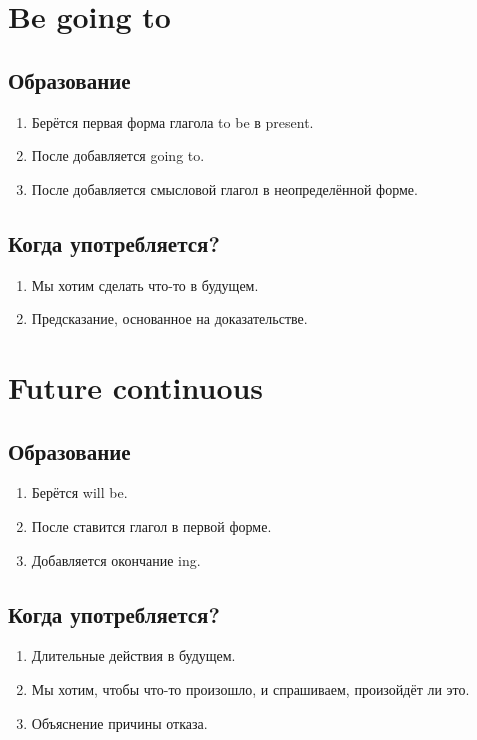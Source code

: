 \documentclass[oneside]{book}
\begin{document}
\section{Be going to}
\subsection{Образование}
\begin{enumerate}
    \item Берётся первая форма глагола to be в present.
    \item После добавляется going to.
    \item После добавляется смысловой глагол в неопределённой форме.
\end{enumerate}

\subsection{Когда употребляется?}
\begin{enumerate}
    \item Мы хотим сделать что-то в будущем.
    \item Предсказание, основанное на доказательстве.
\end{enumerate}

\section{Future continuous}
\subsection{Образование}
\begin{enumerate}
    \item Берётся will be.
    \item После ставится глагол в первой форме.
    \item Добавляется окончание ing.
\end{enumerate}

\subsection{Когда употребляется?}
\begin{enumerate}
    \item Длительные действия в будущем.
    \item Мы хотим, чтобы что-то произошло, и спрашиваем, произойдёт ли это.
    \item Объяснение причины отказа.
\end{enumerate}
\end{document}
